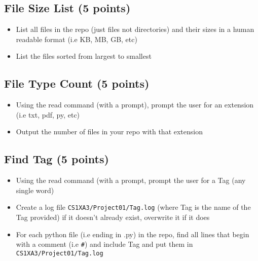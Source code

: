 \documentclass{article}
\begin{document}
\subsection{File Size List (5 points)}
\label{sec:org6869260}
\begin{itemize}
\item List all files in the repo (just files not directories) and their sizes in
a human readable format (i.e KB, MB, GB, etc)
\item List the files sorted from largest to smallest
\end{itemize}
\subsection{File Type Count (5 points)}
\label{sec:org546e8f6}
\begin{itemize}
\item Using the read command (with a prompt), prompt the user for an extension
(i.e txt, pdf, py, etc)
\item Output the number of files in your repo with that extension
\end{itemize}
\subsection{Find Tag (5 points)}
\label{sec:orgd861ef6}
\begin{itemize}
\item Using the read command (with a prompt, prompt the user for a Tag (any
single word)
\item Create a log file \texttt{CS1XA3/Project01/Tag.log} (where Tag is the name of the
Tag provided) if it doesn't already exist, overwrite it if it does
\item For each python file (i.e ending in {\color{purple}.py}) in the repo, find all lines
that begin with a comment (i.e \texttt{\#}) and include Tag and put them in \texttt{CS1XA3/Project01/Tag.log}
\end{itemize}
\end{document}
